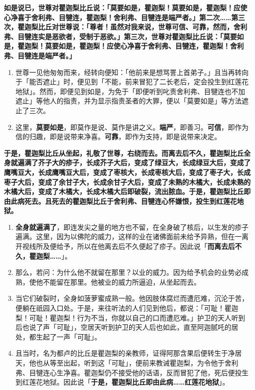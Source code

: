 \textbf{如是说已，世尊对瞿迦梨比丘说：「莫要如是，瞿迦梨！莫要如是，瞿迦梨！应使心净喜于舍利弗、目犍连，瞿迦梨！舍利弗、目犍连是端严者。」第二次……第三次，瞿迦梨比丘对世尊说：「尊者！虽然对我来说，世尊可信、可靠，然而，舍利弗、目犍连实是恶欲者，受制于恶欲。」第三次，世尊对瞿迦梨比丘说：「莫要如是，瞿迦梨！莫要如是，瞿迦梨！应使心净喜于舍利弗、目犍连，瞿迦梨！舍利弗、目犍连是端严者。」}

\begin{enumerate}\item 世尊一见他匆匆而来，经转向便知：「他前来是想骂詈上首弟子。」且当再转向于「能否遮止」时，便见到「不能，前来冒犯了二长老后，定会投生到红莲花地狱」。然而，即便见到如是，为免于「即便听到叱责舍利弗、目犍连也不加遮止」等他人的指责，并为显示指责圣者的大罪，便以「莫要如是」等方法遮止了三次。
\item 这里，\textbf{莫要如是}，即莫作是说、莫作是讲之义。\textbf{端严}，即善习。\textbf{可信}，即作为信的归趣，即是说带来净喜。\textbf{可靠}，即作为支持，即是说带来决定。\end{enumerate}

\textbf{于是，瞿迦梨比丘从坐起，礼敬了世尊，右绕而去。而离去后不久，瞿迦梨比丘全身就遍满了芥子大的疹子，长成芥子大后，变成了绿豆大，长成绿豆大后，变成了鹰嘴豆大，长成鹰嘴豆大后，变成了枣核大，长成枣核大后，变成了枣子大，长成枣子大后，变成了余甘子大，长成余甘子大后，变成了未熟的木橘大，长成未熟的木橘大后，变成了木橘大，长成木橘大后即破裂，流出脓血。于是，瞿迦梨比丘即由此病死去。且死去的瞿迦梨比丘于舍利弗、目犍连心怀嫌恨，投生到红莲花地狱。}

\begin{enumerate}\item \textbf{全身就遍满了}，即连发尖之量的地方也不留，在全身破了核后，以生发的疹子遍满。这里，因为以佛陀的威力，这样的业在诸佛面前未给予异熟，但在一离开视线所及便给予，所以在他离去后不久便起了疹子。因此说「\textbf{而离去后不久，瞿迦梨……}」。
\item 那么，若问：为什么他不就留在那里？以业的威力。因为给予机会的业势必成熟，使他不能留在那里。他被业的威力所逼迫，从坐起而去。
\item 当它们破裂时，全身如菠萝蜜成熟一般。他因肢体腐烂而遭厄难，沉沦于苦，便躺在祇园入口处。于是，来往听法的人们见到他后，都说：「可耻！瞿迦梨！可耻！瞿迦梨！行为不当，你就以自己的口而遭厄难。」护卫的天人听到后也说了声「可耻」，空居天听到护卫的天人后也如此，直至阿迦腻吒的居处，都生起了一声「可耻」。
\item 且当时，名为都卢的比丘是瞿迦梨的亲教师，证得阿那含果后便转生于净居天，他也从等至出起，听到这「可耻」，便前来教诫瞿迦梨，为令他于舍利弗、目犍连心生净喜。瞿迦梨仍不接受他的话语，反而冒犯了他，死后便投生到红莲花地狱。因此说「\textbf{于是，瞿迦梨比丘即由此病……红莲花地狱}」。\end{enumerate}

